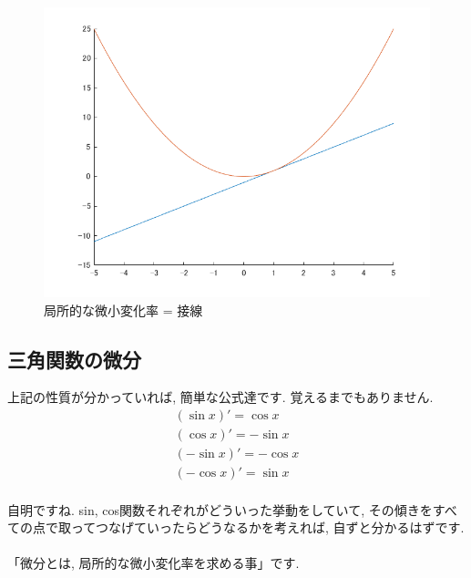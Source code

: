 \documentclass[11pt,a4paper]{jreport}
\begin{document}
\begin{figure}[H]
\label{im:sessen}
  \centering
  \includegraphics[width=120mm,bb=0 0 700 525]{figures/sessen.png}
  \caption{局所的な微小変化率 = 接線}
\end{figure}

\subsection{三角関数の微分}
上記の性質が分かっていれば, 簡単な公式達です. 覚えるまでもありません.
\begin{eqnarray}
(\sin x)' = \cos x \\
(\cos x)' = -\sin x \\
(-\sin x)' = -\cos x \\
(-\cos x)' = \sin x
\end{eqnarray}
\\
自明ですね. sin, cos関数それぞれがどういった挙動をしていて, その傾きをすべての点で取ってつなげていったらどうなるかを考えれば, 自ずと分かるはずです.\\
\\
「微分とは, 局所的な微小変化率を求める事」です.\\
\end{document}
